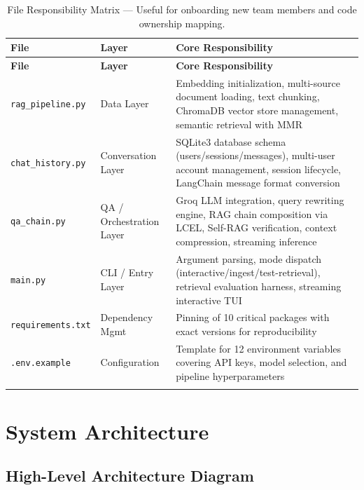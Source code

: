 \documentclass[12pt,a4paper]{article}
\begin{document}
\begin{longtable}{@{}lp{4cm}p{8.5cm}@{}}
\toprule
\textbf{File} & \textbf{Layer} & \textbf{Core Responsibility} \\
\midrule
\endfirsthead
\toprule
\textbf{File} & \textbf{Layer} & \textbf{Core Responsibility} \\
\midrule
\endhead
\bottomrule
\endfoot
\texttt{rag\_pipeline.py} & Data Layer & Embedding initialization, multi-source document loading, text chunking, ChromaDB vector store management, semantic retrieval with MMR \\
\texttt{chat\_history.py} & Conversation Layer & SQLite3 database schema (users/sessions/messages), multi-user account management, session lifecycle, LangChain message format conversion \\
\texttt{qa\_chain.py} & QA / Orchestration Layer & Groq LLM integration, query rewriting engine, RAG chain composition via LCEL, Self-RAG verification, context compression, streaming inference \\
\texttt{main.py} & CLI / Entry Layer & Argument parsing, mode dispatch (interactive/ingest/test-retrieval), retrieval evaluation harness, streaming interactive TUI \\
\texttt{requirements.txt} & Dependency Mgmt & Pinning of 10 critical packages with exact versions for reproducibility \\
\texttt{.env.example} & Configuration & Template for 12 environment variables covering API keys, model selection, and pipeline hyperparameters \\
\bottomrule
\caption{File Responsibility Matrix — Useful for onboarding new team members and code ownership mapping.}
\end{longtable}

\newpage

\section{System Architecture}

\subsection{High-Level Architecture Diagram}
\end{document}
